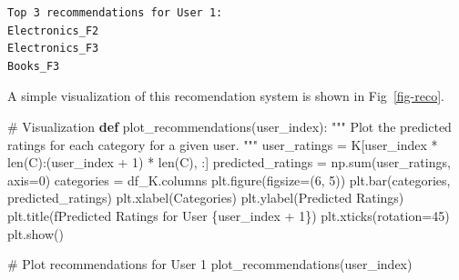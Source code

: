 \documentclass[
  letterpaper,
  DIV=11,
  numbers=noendperiod]{scrreprt}
\newenvironment{Shaded}{\begin{snugshade}}{\end{snugshade}}
\newcommand{\BuiltInTok}[1]{\textcolor[rgb]{0.00,0.23,0.31}{#1}}
\newcommand{\CommentTok}[1]{\textcolor[rgb]{0.37,0.37,0.37}{#1}}
\newcommand{\DecValTok}[1]{\textcolor[rgb]{0.68,0.00,0.00}{#1}}
\newcommand{\KeywordTok}[1]{\textcolor[rgb]{0.00,0.23,0.31}{\textbf{#1}}}
\newcommand{\NormalTok}[1]{\textcolor[rgb]{0.00,0.23,0.31}{#1}}
\newcommand{\OperatorTok}[1]{\textcolor[rgb]{0.37,0.37,0.37}{#1}}
\newcommand{\SpecialCharTok}[1]{\textcolor[rgb]{0.37,0.37,0.37}{#1}}
\newcommand{\SpecialStringTok}[1]{\textcolor[rgb]{0.13,0.47,0.30}{#1}}
\newcommand{\StringTok}[1]{\textcolor[rgb]{0.13,0.47,0.30}{#1}}
\theoremstyle{plain}
\theoremstyle{definition}
\theoremstyle{remark}
\begin{document}
\begin{tcolorbox}
\begin{verbatim}
Top 3 recommendations for User 1:
Electronics_F2
Electronics_F3
Books_F3
\end{verbatim}

A simple visualization of this recomendation system is shown in
Fig~\ref{fig-reco}.

\begin{Shaded}
\begin{Highlighting}[]
\CommentTok{\# Visualization}
\KeywordTok{def}\NormalTok{ plot\_recommendations(user\_index):}
    \CommentTok{""" Plot the predicted ratings for each category for a given user. """}
\NormalTok{    user\_ratings }\OperatorTok{=}\NormalTok{ K[user\_index }\OperatorTok{*} \BuiltInTok{len}\NormalTok{(C):(user\_index }\OperatorTok{+} \DecValTok{1}\NormalTok{) }\OperatorTok{*} \BuiltInTok{len}\NormalTok{(C), :]}
\NormalTok{    predicted\_ratings }\OperatorTok{=}\NormalTok{ np.}\BuiltInTok{sum}\NormalTok{(user\_ratings, axis}\OperatorTok{=}\DecValTok{0}\NormalTok{)}
\NormalTok{    categories }\OperatorTok{=}\NormalTok{ df\_K.columns}
\NormalTok{    plt.figure(figsize}\OperatorTok{=}\NormalTok{(}\DecValTok{6}\NormalTok{, }\DecValTok{5}\NormalTok{))}
\NormalTok{    plt.bar(categories, predicted\_ratings)}
\NormalTok{    plt.xlabel(}\StringTok{\textquotesingle{}Categories\textquotesingle{}}\NormalTok{)}
\NormalTok{    plt.ylabel(}\StringTok{\textquotesingle{}Predicted Ratings\textquotesingle{}}\NormalTok{)}
\NormalTok{    plt.title(}\SpecialStringTok{f\textquotesingle{}Predicted Ratings for User }\SpecialCharTok{\{}\NormalTok{user\_index }\OperatorTok{+} \DecValTok{1}\SpecialCharTok{\}}\SpecialStringTok{\textquotesingle{}}\NormalTok{)}
\NormalTok{    plt.xticks(rotation}\OperatorTok{=}\DecValTok{45}\NormalTok{)}
\NormalTok{    plt.show()}

\CommentTok{\# Plot recommendations for User 1}
\NormalTok{plot\_recommendations(user\_index)}
\end{Highlighting}
\end{Shaded}

\begin{figure}[H]

\centering{

}
\end{figure}
\end{tcolorbox}
\end{document}
